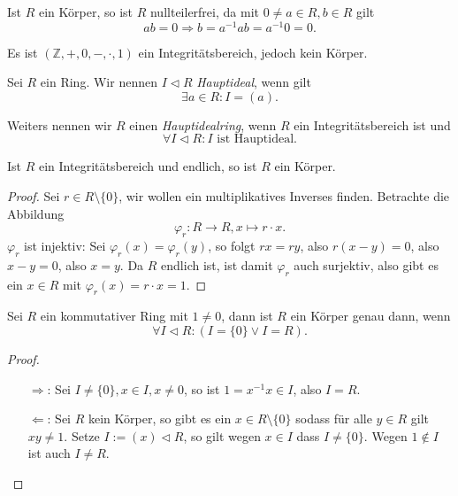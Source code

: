 \begin{example}
    Ist $R$ ein Körper, so ist $R$ nullteilerfrei, da mit $0 \neq a \in R, b \in R$ gilt
    $$ a b = 0 \Rightarrow b = a^{-1} a b = a^{-1} 0 = 0. $$
\end{example}

\begin{example}
    Es ist $(\mathbb{Z}, +, 0, -, \cdot, 1)$ ein Integritätsbereich, jedoch kein Körper.
\end{example}

\begin{definition}
    Sei $R$ ein Ring. Wir nennen $I \vartriangleleft R$ \emph{Hauptideal}, wenn gilt
    $$ \exists a \in R: I = (a). $$

    Weiters nennen wir $R$ einen \emph{Hauptidealring}, wenn $R$ ein Integritätsbereich ist und
    $$ \forall I \vartriangleleft R : I \text{ ist Hauptideal}. $$
\end{definition}

\begin{proposition}
    Ist $R$ ein Integritätsbereich und endlich, so ist $R$ ein Körper.
\end{proposition}

\begin{proof}
    Sei $r \in R \setminus \{0\}$, wir wollen ein multiplikatives Inverses finden. Betrachte die Abbildung
    $$ \varphi_r : R \to R, x \mapsto r \cdot x. $$
    $\varphi_r$ ist injektiv: Sei $\varphi_r(x) = \varphi_r(y)$, so folgt $rx = ry$, also $r(x-y) = 0$, also $x-y=0$, also $x=y$.
    Da $R$ endlich ist, ist damit $\varphi_r$ auch surjektiv, also gibt es ein $x \in R$ mit $\varphi_r(x) = r \cdot x = 1$.
\end{proof}

\begin{proposition}
    Sei $R$ ein kommutativer Ring mit $1\neq 0$, dann ist $R$ ein Körper genau dann, wenn
    $$ \forall I \vartriangleleft R: (I = \{0\} \lor I = R). $$
\end{proposition}

\begin{proof}{\ }
    \begin{itemize}
        \item[$\Rightarrow$:] Sei $I \neq \{0\}, x \in I, x \neq 0$, so ist $1 = x^{-1} x \in I$, also $I = R$.
        \item[$\Leftarrow$:] Sei $R$ kein Körper, so gibt es ein $x \in R \setminus \{0\}$ sodass für alle $y \in R$ gilt $xy \neq 1$. Setze $I := (x) \vartriangleleft R$, so gilt wegen $x \in I$ dass $I \neq \{0\}$. Wegen $1 \notin I$ ist auch $I \neq R$.
    \end{itemize}
\end{proof}

